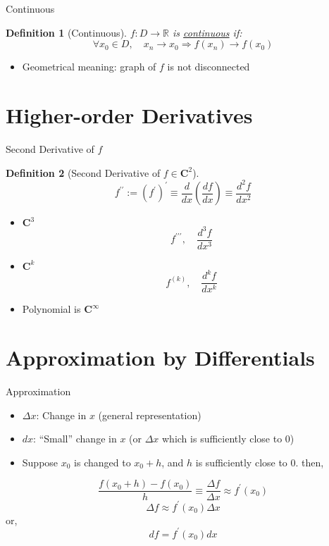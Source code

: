 \documentclass[a4paper,11pt]{article}
\newtheorem{defn}{Definition}
\begin{document}
\begin{frame}[t]{Continuous}
	\begin{defn}
		[Continuous]
		$f:D\rightarrow \mathbb{R}$ is \uline{continuous} if:\[
			\forall x_0 \in D,\quad x_n \rightarrow x_0 \Rightarrow f(x_n)\rightarrow f(x_0)
		\]
	\end{defn}
	\begin{itemize}
		\item Geometrical meaning: graph of $f$ is not disconnected
	\end{itemize}
\end{frame}


\section{Higher-order Derivatives} %
\label{sec:higher_order_derivatives}

\begin{frame}[t]{Second Derivative of $f$}
	\begin{defn}
		[Second Derivative of $f\in \mathbf{C}^2$]
		\[
			f^{\prime\prime} := (f^\prime)^\prime \equiv \frac{d}{dx}\left(\frac{df}{dx}\right) \equiv \frac{d^2f}{dx^2}
		\]
	\end{defn}
	\begin{itemize}
		\item $\mathbf{C}^3$
		\[
			f^{\prime\prime\prime},\quad \frac{d^3f}{dx^3}
		\]
		\item $\mathbf{C}^k$
		\[
			f^{(k)},\quad \frac{d^kf}{dx^k}
		\]
		\item Polynomial is $\mathbf{C}^\infty$
	\end{itemize}
\end{frame}

\section{Approximation by Differentials} %
\label{sec:approximation_by_differentials}


\begin{frame}[t]{Approximation}
	\begin{itemize}
		\item $\Delta x$: Change in $x$ (general representation)
		\item $dx$: ``Small'' change in $x$ (or $\Delta x$ which is sufficiently close to 0)
		\item Suppose $x_0$ is changed to $x_0+h$, and $h$ is sufficiently close to 0. then, 
	\end{itemize}
	\[
		\frac{f(x_0+h)-f(x_0)}{h}\equiv \frac{\Delta f}{\Delta x} \approx f^\prime (x_0)
	\]
	\[
		\Delta f \approx f^\prime (x_0) \Delta x
	\] or, \[
		df = f^\prime (x_0) dx
	\]
\end{frame}
\end{document}
